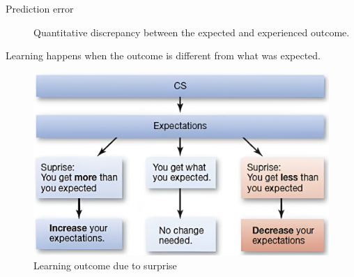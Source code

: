 \begin{description}
    \item[Prediction error] 
        Quantitative discrepancy between the expected and experienced outcome.
\end{description}

\begin{remark}
    Learning happens when the outcome is different from what was expected.
\end{remark}

\begin{figure}[H]
    \centering
    \includegraphics[width=0.4\linewidth]{./img/surprise.png}
    \caption{Learning outcome due to surprise}
\end{figure}

